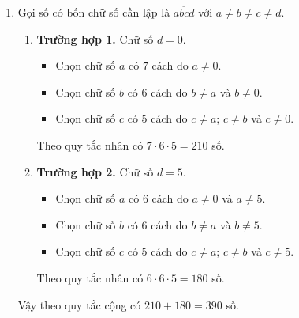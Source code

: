 \begin{vd}
{\begin{enumerate}
			      \begin{enumerate}
				      \item \textbf{Trường hợp 1.} Chữ số $d=0$.
				            \begin{itemize}
					            \item Chọn chữ số $a$ có $7$ cách do $a\ne 0$.
					            \item Chọn chữ số $b$ có $6$ cách do $b\ne a$ và $b\ne 0$.
					            \item Chọn chữ số $c$ có $5$ cách do $c\ne a$; $c\ne b$ và $c\ne 0$.
				            \end{itemize}
				            Theo quy tắc nhân có $7\cdot 6\cdot 5=210$ số.
				      \item \textbf{Trường hợp 2.} Chữ số $d\in \{2;4;6\}$ nên có $3$ cách chọn.
				            \begin{itemize}
					            \item Chọn chữ số $a$ có $6$ cách do $a\ne 0$ và $a \ne d$.
					            \item Chọn chữ số $b$ có $6$ cách do $b\ne a$ và $b\ne d$.
					            \item Chọn chữ số $c$ có $5$ cách do $c\ne a$; $c\ne b$ và $c\ne d$.
				            \end{itemize}
				            Theo quy tắc nhân có $3\cdot 6\cdot 6\cdot 5=540$ số.
			      \end{enumerate}
			      Vậy theo quy tắc cộng có $210+540=750$ số.
			\item Gọi số có bốn chữ số cần lập là $\overline{abcd}$ với $a\ne b\ne c\ne d$.
			      \begin{enumerate}
				      \item \textbf{Trường hợp 1.} Chữ số $d=0$.
				            \begin{itemize}
					            \item Chọn chữ số $a$ có $7$ cách do $a\ne 0$.
					            \item Chọn chữ số $b$ có $6$ cách do $b\ne a$ và $b\ne 0$.
					            \item Chọn chữ số $c$ có $5$ cách do $c\ne a$; $c\ne b$ và $c\ne 0$.
				            \end{itemize}
				            Theo quy tắc nhân có $7\cdot 6\cdot 5=210$ số.
				      \item \textbf{Trường hợp 2.} Chữ số $d=5$.
				            \begin{itemize}
					            \item Chọn chữ số $a$ có $6$ cách do $a\ne 0$ và $a \ne 5$.
					            \item Chọn chữ số $b$ có $6$ cách do $b\ne a$ và $b\ne 5$.
					            \item Chọn chữ số $c$ có $5$ cách do $c\ne a$; $c\ne b$ và $c\ne 5$.
				            \end{itemize}
				            Theo quy tắc nhân có $6\cdot 6\cdot 5=180$ số.
			      \end{enumerate}
			      Vậy theo quy tắc cộng có $210+180=390$ số.
		\end{enumerate}
	}
\end{vd}
